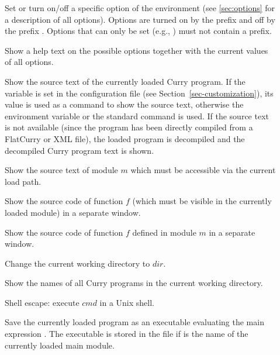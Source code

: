 \begin{description}
\item[]
Set or turn on/off a specific option
of the \CYS environment (see \ref{sec:options} for a description
of all options). Options are turned on by the prefix
\ccode{+} and off by the prefix \ccode{-}. Options that can only
be set (e.g., ) must not contain a prefix.

\item[]
Show a help text on the possible options
together with the current values of all options.

\item[]
Show the source text of the currently loaded Curry program.
If the variable  is set in the
configuration file 
(see Section~\ref{sec-customization}),
its value is used as a command to show the source text,
otherwise the environment variable  or the standard command
 is used.
If the source text is not available
(since the program has been directly compiled from a FlatCurry
or XML file), the loaded program is decompiled and
the decompiled Curry program text is shown.

\item[]
Show the source text of module $m$ which must be accessible
via the current load path.

\item[]
Show the source code of function $f$ (which must be visible
in the currently loaded module) in a separate window.

\item[]
Show the source code of function $f$ defined in module $m$
in a separate window.

\item[]
Change the current working directory to $dir$.

\item[] Show the names of all Curry programs
in the current working directory.

\item[] Shell escape: execute $cmd$ in a Unix shell.

\item[] Save the currently loaded
program as an executable evaluating the main expression .
The executable is stored in the file 
if  is the name of the currently loaded main module.


\end{description}
